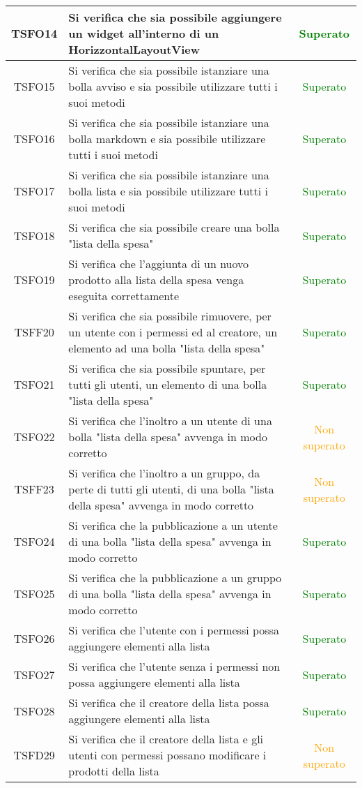 \begin{center}
\begin{longtable}{|c|>{\centering}m{10cm}|c|}
		TSFO14 & Si verifica che sia possibile aggiungere un widget all'interno di un HorizzontalLayoutView & \textcolor{Green}{Superato}\\ \hline
		TSFO15 & Si verifica che sia possibile istanziare una bolla avviso e sia possibile utilizzare tutti i suoi metodi & \textcolor{Green}{Superato}\\ \hline
		TSFO16 & Si verifica che sia possibile istanziare una bolla markdown e sia possibile utilizzare tutti i suoi metodi & \textcolor{Green}{Superato}\\ \hline
		TSFO17 & Si verifica che sia possibile istanziare una bolla lista e sia possibile utilizzare tutti i suoi metodi & \textcolor{Green}{Superato}\\ \hline
		TSFO18 & Si verifica che sia possibile creare una bolla "lista della spesa" & \textcolor{Green}{Superato}\\ \hline
		TSFO19 & Si verifica che l'aggiunta di un nuovo prodotto alla lista della spesa venga eseguita correttamente & \textcolor{Green}{Superato}\\ \hline
		TSFF20 & Si verifica che sia possibile rimuovere, per un utente con i permessi ed al creatore, un elemento ad una bolla "lista della spesa" & \textcolor{Green}{Superato}\\ \hline
		TSFO21 & Si verifica che sia possibile spuntare, per tutti gli utenti, un elemento di una bolla "lista della spesa" & \textcolor{Green}{Superato}\\ \hline
		TSFO22 & Si verifica che l'inoltro a un utente di una bolla "lista della spesa" avvenga in modo corretto & \textcolor{Orange}{Non superato}\\ \hline
		TSFF23 & Si verifica che l'inoltro a un gruppo, da perte di tutti gli utenti, di una bolla "lista della spesa" avvenga in modo corretto & \textcolor{Orange}{Non superato}\\ \hline
		TSFO24 & Si verifica che la pubblicazione a un utente di una bolla "lista della spesa" avvenga in modo corretto & \textcolor{Green}{Superato}\\ \hline
		TSFO25 & Si verifica che la pubblicazione a un gruppo di una bolla "lista della spesa" avvenga in modo corretto & \textcolor{Green}{Superato}\\ \hline
		TSFO26 & Si verifica che l'utente con i permessi possa aggiungere elementi alla lista & \textcolor{Green}{Superato}\\ \hline
		TSFO27 & Si verifica che l'utente senza i permessi non possa aggiungere elementi alla lista & \textcolor{Green}{Superato}\\ \hline
		TSFO28 & Si verifica che il creatore della lista possa aggiungere elementi alla lista & \textcolor{Green}{Superato}\\ \hline
		TSFD29 & Si verifica che il creatore della lista e gli utenti con permessi possano modificare i prodotti della lista & \textcolor{Orange}{Non superato}\\ \hline
	\end{longtable}
\end{center}
